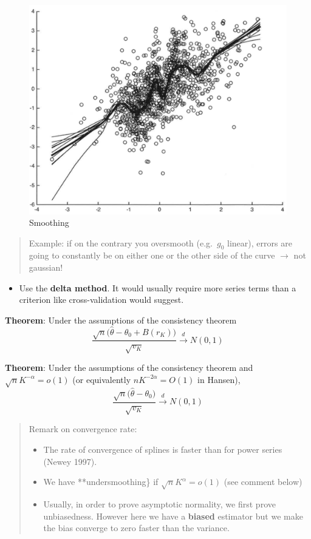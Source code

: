 \documentclass[12pt,]{book}
\providecommand{\tightlist}{%
  \setlength{\itemsep}{0pt}\setlength{\parskip}{0pt}}
\begin{document}
\begin{figure}
\centering
\includegraphics{figures/Fig_541.png}
\caption{Smoothing}
\end{figure}

\begin{quote}
Example: if on the contrary you oversmooth (e.g.~\(g_0\) linear), errors are going to constantly be on either one or the other side of the curve \(\to\) not gaussian!
\end{quote}

\begin{itemize}
\tightlist
\item
  Use the \textbf{delta method}. It would usually require more series terms than a criterion like cross-validation would suggest.
\end{itemize}

\textbf{Theorem}:
Under the assumptions of the consistency theorem
\[
    \frac{\sqrt{n} \Big(\hat{\theta} - \theta_0 + B(r_K) \Big)}{\sqrt{v_K}} \overset{d}{\to} N (0,1)
\]

\textbf{Theorem}:
Under the assumptions of the consistency theorem and \(\sqrt{n} K^{-\alpha} = o(1)\) (or equivalently \(n K^{-2\alpha} = O(1)\) in Hansen),
\[
  \frac{\sqrt{n} \Big(\hat{\theta} - \theta_0 \Big)}{\sqrt{v_K}} \overset{d}{\to} N (0,1)
\]

\begin{quote}
Remark on convergence rate:

\begin{itemize}
\tightlist
\item
  The rate of convergence of splines is faster than for power series (Newey 1997).
\item
  We have **undersmoothing\} if \(\sqrt{n} K^{\alpha} = o(1)\) (see comment below)
\item
  Usually, in order to prove asymptotic normality, we first prove unbiasedness. However here we have a \textbf{biased} estimator but we make the bias converge to zero faster than the variance.
\end{itemize}
\end{quote}
\end{document}
